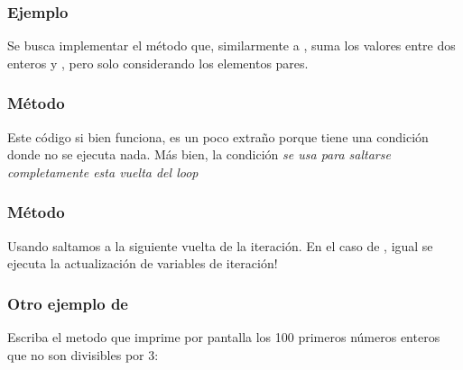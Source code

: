 \documentclass{beamer}
\begin{document}
\begin{frame}
  \frametitle{Ejemplo }

  \begin{block}{}
    Se busca implementar el método  que,
    similarmente a , suma los valores entre dos
    enteros  y , pero solo considerando los elementos
    pares.
  \end{block}
  
\end{frame}

\begin{frame}[fragile]
  \frametitle{Método }

  Este código si bien funciona, es un poco extraño porque tiene una
  condición donde no se ejecuta nada. Más bien, la condición \emph{se
    usa para saltarse completamente esta vuelta del loop}
  
\end{frame}

\begin{frame}[fragile]
  \frametitle{Método }

  Usando  saltamos a la siguiente vuelta de la
  iteración. En el caso de , igual se ejecuta la
  actualización de variables de iteración!
  
\end{frame}

\begin{frame}[fragile]
  \frametitle{Otro ejemplo de }

  Escriba el metodo  que imprime por pantalla los 100 primeros números enteros que no son
  divisibles por 3:

\end{frame}
\end{document}
